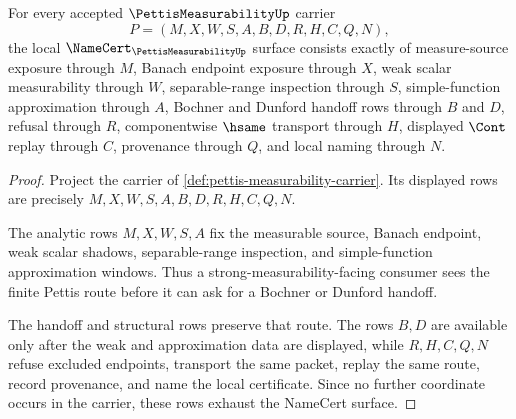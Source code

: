 \begin{theorem}
\label{thm:pettis-measurability-namecert-obligations}
For every accepted $\PettisMeasurabilityUp$ carrier
$$
P=(M,X,W,S,A,B,D,R,H,C,Q,N),
$$
the local $\NameCert_{\PettisMeasurabilityUp}$ surface consists exactly of measure-source exposure through $M$, Banach endpoint exposure through $X$, weak scalar measurability through $W$, separable-range inspection through $S$, simple-function approximation through $A$, Bochner and Dunford handoff rows through $B$ and $D$, refusal through $R$, componentwise $\hsame$ transport through $H$, displayed $\Cont$ replay through $C$, provenance through $Q$, and local naming through $N$.
\end{theorem}
\begin{proof}
Project the carrier of \autoref{def:pettis-measurability-carrier}. Its displayed rows are precisely $M,X,W,S,A,B,D,R,H,C,Q,N$.

The analytic rows $M,X,W,S,A$ fix the measurable source, Banach endpoint, weak scalar shadows, separable-range inspection, and simple-function approximation windows. Thus a strong-measurability-facing consumer sees the finite Pettis route before it can ask for a Bochner or Dunford handoff.

The handoff and structural rows preserve that route. The rows $B,D$ are available only after the weak and approximation data are displayed, while $R,H,C,Q,N$ refuse excluded endpoints, transport the same packet, replay the same route, record provenance, and name the local certificate. Since no further coordinate occurs in the carrier, these rows exhaust the NameCert surface.
\end{proof}


